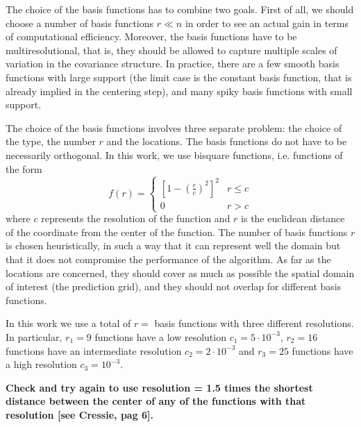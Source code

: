 \documentclass[11pt]{article}
\begin{document}
The choice of the basis functions has to combine two goals. First of all, we should choose a number of basis functions $r \ll n$ in order to see an actual gain in terms of computational efficiency. Moreover, the basis functions have to be multiresolutional, that is, they should be allowed to capture multiple scales of variation in the covariance structure. In practice, there are a few smooth basis functions with large support (the limit case is the constant basis function, that is already implied in the centering step), and many spiky basis functions with small support. 

The choice of the basis functions involves three separate problem: the choice of the type, the number $r$ and the locations. The basis functions do not have to be necessarily orthogonal. In this work, we use bisquare functions, i.e. functions of the form
\begin{equation*}
f(r) = \begin{cases}
\left[ 1 - \left( \frac{r}{c} \right)^2 \right]^2 & r \leq c
\\
0 & r > c
\end{cases}
\end{equation*}
where $c$ represents the resolution of the function and $r$ is the euclidean distance of the coordinate from the center of the function. The number of basis functions $r$ is chosen heuristically, in such a way that it can represent well the domain but that it does not compromise the performance of the algorithm. As far as the locations are concerned, they should cover as much as possible the spatial domain of interest (the prediction grid), and they should not overlap for different basis functions.

In this work we use a total of $r = $ basis functions with three different resolutions. In particular, $r_1 = 9$ functions have a low resolution $c_1 = 5 \cdot 10^{-3}$, $r_2 = 16$ functions have an intermediate resolution $c_2 = 2 \cdot 10^{-3}$ and $r_3 = 25$ functions have a high resolution $c_3 = 10^{-3}$. 

\textbf{Check and try again to use resolution = 1.5 times the shortest distance between the center of any of the functions with that resolution [see Cressie, pag 6].}
\end{document}
